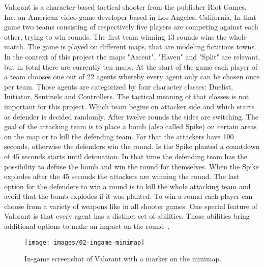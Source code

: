 Valorant is a character-based tactical shooter from the publisher Riot Games, Inc. an American 
video game developer based in Los Angeles, California. In that game two teams consisting of 
respectively five players are competing against each other, trying to win rounds. The first team 
winning 13 rounds wins the whole match. The game is played on different maps, that are modeling
fictitious towns. In the context of this project the maps "Ascent", "Haven" and "Split" are relevant, 
but in total there are currently ten maps. At the start of the game each player of a team chooses one 
out of 22 agents whereby every agent only can be chosen once per team. Those agents are 
categorized by four character classes: Duelist, Initiator, Sentinels and Controllers. The tactical 
meaning of that classes is not important for this project. Which team begins on attacker side and 
which starts as defender is decided randomly. After twelve rounds the sides are switching. The goal 
of the attacking team is to place a bomb (also called Spike) on certain areas on the map or to kill the 
defending team. For that the attackers have 100 seconds, otherwise the defenders win the round. Is 
the Spike planted a countdown of 45 seconds starts until detonation. In that time the defending team 
has the possibility to defuse the bomb and win the round for themselves. When the Spike explodes 
after the 45 seconds the attackers are winning the round. The last option for the defenders to win a 
round is to kill the whole attacking team and avoid that the bomb explodes if it was planted. To win a 
round each player can choose from a variety of weapons like in all shooter games. One special 
feature of Valorant is that every agent has a distinct set of abilities. Those abilities bring additional 
options to make an impact on the round~\cite{riotgames-valorant, spike2023, unrated2023}.

\begin{figure}
	\centering
	\texttt{[image: images/02-ingame-minimap]}
	\caption[In-game screenshot of Valorant.]{In-game screenshot of Valorant with a marker on the 
	minimap.}
	\label{fig:intro:ingame}
\end{figure}

